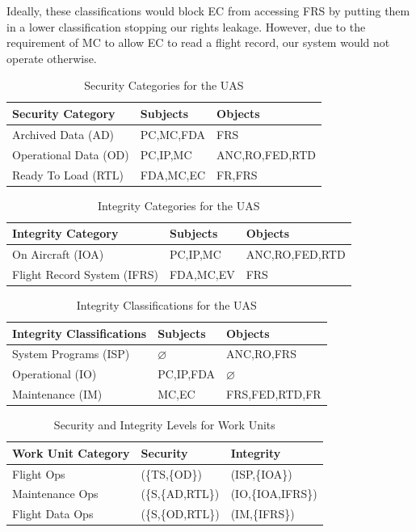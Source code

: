 \documentclass[10pt,journal,compsoc]{IEEEtran}
\begin{document}
Ideally, these classifications would block EC from accessing FRS by putting them in a lower classification stopping our rights leakage. However, due to the requirement of MC to allow EC to read a flight record, our system would not operate otherwise. 


\begin{table}[]
  \caption{Security Categories for the UAS}
  \label{tab:security-categories}
  \centering
  \begin{tabular}{lll}
  \hline
  \textbf{Security Category} & \textbf{Subjects} & \textbf{Objects} \\
  \hline
  Archived Data (AD)         & PC,MC,FDA         & FRS              \\
  Operational Data (OD)      & PC,IP,MC          & ANC,RO,FED,RTD   \\
  Ready To Load (RTL)        & FDA,MC,EC         & FR,FRS    
  \end{tabular}
\end{table}

\begin{table}[]
  \caption{Integrity Categories for the UAS}
  \label{tab:integrity-categories}
  \centering
  \begin{tabular}{lll}
  \hline
  \textbf{Integrity Category} & \textbf{Subjects} & \textbf{Objects}  \\
  \hline
  On Aircraft (IOA)            & PC,IP,MC        & ANC,RO,FED,RTD \\
  Flight Record System (IFRS)  & FDA,MC,EV       & FRS        
  \end{tabular}
\end{table}

\begin{table}[]
  \caption{Integrity Classifications for the UAS}
  \label{tab:integrity-classifications}
  \centering
  \begin{tabular}{lll}
  \hline
  \textbf{Integrity Classifications} & \textbf{Subjects} & \textbf{Objects} \\
  \hline
  System Programs (ISP)                  & $\varnothing$    & ANC,RO,FRS     \\
  Operational (IO)                       & PC,IP,FDA        & $\varnothing$  \\
  Maintenance (IM)                       & MC,EC            & FRS,FED,RTD,FR      
  \end{tabular}
\end{table}

\begin{table}[]
  \caption{Security and Integrity Levels for Work Units}
  \label{tab:security-integrity-work-units}
  \centering
  \begin{tabular}{lll}
  \hline
  \textbf{Work Unit Category} & \textbf{Security} & \textbf{Integrity} \\
  \hline
  Flight Ops                  & (\{TS,\{OD\})    & (ISP,\{IOA\})      \\
  Maintenance Ops             & (\{S,\{AD,RTL\}) & (IO,\{IOA,IFRS\})  \\
  Flight Data Ops             & (\{S,\{OD,RTL\}) & (IM,\{IFRS\})      
  \end{tabular}
\end{table}
\end{document}
